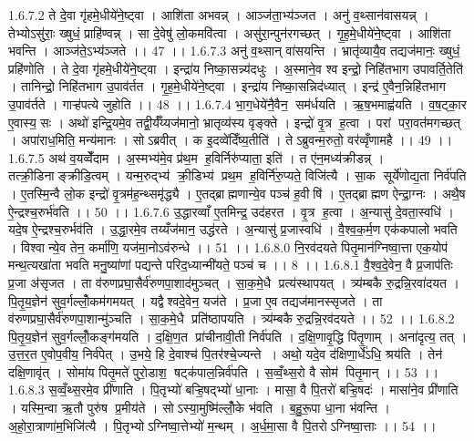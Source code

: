 1.6.7.2
ते दे॒वा गृ॑हमे॒धीये॑ने॒ष्ट्वा । आशि॑ता अभवन्न् । आञ्ज॑ता॒भ्य॑ञ्जत । अनु॑ व॒थ्सान॑वासयन्न् । तेभ्योऽसु॑राः॒ ख्षुधं॒ प्राहि॑ण्वन्न् । सा दे॒वेषु॑ लो॒कमवि॑त्वा । असु॑रा॒न्पुन॑रगच्छत् । गृ॒ह॒मे॒धीये॑ने॒ष्ट्वा । आशि॑ता भवन्ति । आञ्ज॑ते॒ऽभ्य॑ञ्जते ।। 47 ।।
1.6.7.3
अनु॑ व॒थ्सान् वा॑सयन्ति । भ्रातृ॑व्यायै॒व तद्यज॑मानः॒ ख्षुधं॒ प्रहि॑णोति । ते दे॒वा गृ॑हमे॒धीये॑ने॒ष्ट्वा । इन्द्रा॑य निष्का॒सन्न्य॑दधुः । अ॒स्माने॒व श्व इन्द्रो॒ निहि॑तभाग उपावर्ति॒तेति॑ । तानिन्द्रो॒ निहि॑तभाग उ॒पाव॑र्तत । गृ॒ह॒मे॒धीये॑ने॒ष्ट्वा । इन्द्रा॑य निष्का॒सन्निद॑ध्यात् । इन्द्र॑ ए॒वैन॒न्निहि॑तभाग उ॒पाव॑र्तते । गाऱ्ह॑पत्ये जुहोति ।। 48 ।।
1.6.7.4
भा॒ग॒धेये॑नै॒वैन॒॒ सम॑र्धयति । ऋ॒ष॒भमाह्व॑यति । व॒ष॒ट्का॒र ए॒वास्य॒ सः । अथो॑ इन्द्रि॒यमे॒व तद्वी॒र्यँ॑य्यज॑मानो॒ भ्रातृव्य॑स्य वृङ्क्ते । इन्द्रो॑ वृ॒त्र ह॒त्वा । परां परा॒वत॑मगच्छत् । अपा॑राध॒मिति॒ मन्य॑मानः । सोऽब्रवीत् । क इ॒दव्वे॑दिँष्य॒तीति॑ । तेऽब्रुवन्म॒रुतो॒ वर॑व्वृँणामहै ।। 49 ।।
1.6.7.5
अथ॑ व॒यव्वेँ॑दाम । अ॒स्मभ्य॑मे॒व प्र॑थ॒म ह॒विर्निरु॑प्याता॒ इति॑ । त ए॑न॒मध्य॑क्रीडन्न् । तत्क्री॒डिनाङ्क्रीडि॒त्वम् । यन्म॒रुद्भ्य॑ क्री॒डिभ्य॑ प्रथ॒म ह॒विर्नि॑रु॒प्यते॒ विजि॑त्यै । सा॒क सूर्ये॑णोद्य॒ता निर्व॑पति । ए॒तस्मि॒न्वै लो॒क इन्द्रो॑ वृ॒त्रम॑ह॒न्थ्समृ॑द्ध्यै । ए॒तद्ब्राह्मणान्ये॒व पञ्च॑ ह॒वीषि॑ । ए॒तद्ब्राह्मण ऐन्द्रा॒ग्नः । अथै॒ष ऐ॒न्द्रश्च॒रुर्भ॑वति ।। 50 ।।
1.6.7.6
उ॒द्धारव्वाँ ए॒तमिन्द्र॒ उद॑हरत । वृ॒त्र ह॒त्वा । अ॒न्यासु॑ दे॒वता॒स्वधि॑ । यदे॒ष ऐ॒न्द्रश्च॒रुर्भव॑ति । उ॒द्धा॒रमे॒व तय्यँज॑मान॒ उद्ध॑रते । अ॒न्यासु॑ प्र॒जास्वधि॑ । वै॒श्व॒क॒र्म॒ण एक॑कपालो भवति । विश्वान्ये॒व तेन॒ कर्मा॑णि॒ यज॑मा॒नोऽव॑रुन्धे ।। 51 ।।
1.6.8.0
नि॒रव॑दयते पितृ॒मान॑ग्निष्वा॒त्ता एक॒योप॑ मन्थ॒त्यखा॑ता भवति मनु॒ष्या॑णां पद्यन्ते परिद॒ध्यान्मी॑यते॒ पञ्च॑ च ।। 8 ।।
1.6.8.1
वै॒श्व॒दे॒वेन॒ वै प्र॒जाप॑तिः प्र॒जा अ॑सृजत । ता व॑रुणप्रघा॒सैर्व॑रुणपा॒शाद॑मुञ्चत् । सा॒क॒मे॒धै प्रत्य॑स्थापयत् । त्र्य॑म्बकै रु॒द्रन्नि॒रवा॑दयत । पि॒तृ॒य॒ज्ञेन॑ सुव॒र्गल्लोँ॒कम॑गमयत् । यद्वैश्वदे॒वेन॒ यज॑ते । प्र॒जा ए॒व तद्यज॑मानस्सृजते । ता व॑रुणप्रघा॒सैर्व॑रुणपा॒शान्मु॑ञ्चति । सा॒क॒मे॒धै प्रति॑ष्ठापयति । त्र्य॑म्बकै रु॒द्रन्नि॒रव॑दयते ।। 52 ।।
1.6.8.2
पि॒तृ॒य॒ज्ञेन॑ सुव॒र्गल्लोँ॒कङ्ग॑मयति । द॒क्षि॒ण॒त प्रा॑चीनावी॒ती निर्व॑पति । द॒क्षि॒णावृ॒द्धि पि॑तृ॒णाम् । अना॑दृत्य॒ तत् । उ॒त्त॒र॒त ए॒वोप॒वीय॒ निर्व॑पेत् । उ॒भये॒ हि दे॒वाश्च॑ पि॒तर॑श्चे॒ज्यन्ते । अथो॒ यदे॒व द॑क्षिणा॒र्धे॑ऽधि॒ श्रय॑ति । तेन॑ दक्षि॒णावृ॑त् । सोमा॑य पितृ॒मते॑ पुरो॒डाश॒॒ षट्क॑पाल॒न्निर्व॑पति । स॒व्वँ॒थ्स॒रो वै सोम॑ पितृ॒मान् ।। 53 ।।
1.6.8.3
स॒व्वँ॒थ्स॒रमे॒व प्री॑णाति । पि॒तृभ्यो॑ बऱ्हि॒षद्भ्यो॑ धा॒नाः । मासा॒ वै पि॒तरो॑ बऱ्हि॒षदः॑ । मासा॑ने॒व प्री॑णाति । यस्मि॒न्वा ऋ॒तौ पुरु॑ष प्र॒मीय॑ते । सोऽस्या॒मुष्मि॑ल्लोँ॒के भ॑वति । ब॒हु॒रू॒पा धा॒ना भ॑वन्ति । अ॒हो॒रा॒त्राणा॑म॒भिजि॑त्यै । पि॒तृभ्योऽग्निष्वा॒त्तेभ्यो॑ म॒न्थम् । अ॒र्ध॒मा॒सा वै पि॒तरोऽग्निष्वा॒त्ताः ।। 54 ।।
